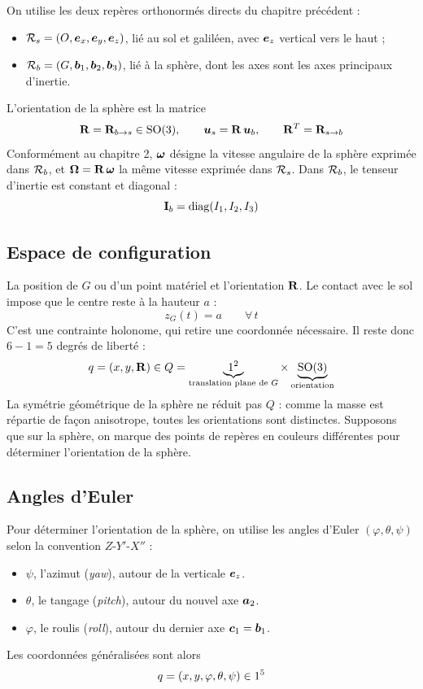 On utilise les deux repères orthonormés directs du chapitre
précédent :
\begin{itemize}
    \item $\mathcal{R}_{s} = (O,\bm{e}_x,\bm{e}_y,\bm{e}_z)$, lié au sol et
        galiléen, avec $\bm{e}_z$ vertical vers le haut ;
    \item $\mathcal{R}_{b} = (G,\bm{b}_1,\bm{b}_2,\bm{b}_3)$, lié à la
        sphère, dont les axes sont les axes principaux d'inertie.
\end{itemize}
L'orientation de la sphère est la matrice
\[
    \mathbf{R} = \mathbf{R}_{b\to s}\in\mathrm{SO}(3),
    \qquad
    \bm{u}_s = \mathbf{R}\,\bm{u}_b,
    \qquad
    \mathbf{R}^T = \mathbf{R}_{s\to b}
\]
Conformément au chapitre 2, $\bm{\omega}$ désigne la vitesse
angulaire de la sphère exprimée dans $\mathcal{R}_{b}$, et
$\bm{\Omega} = \mathbf{R}\,\bm{\omega}$ la même vitesse exprimée dans
$\mathcal{R}_{s}$. Dans $\mathcal{R}_{b}$, le tenseur d'inertie est constant et
diagonal :
\[
    \mathbf{I}_b = \mathrm{diag}(I_1,I_2,I_3)
\]

\subsection{Espace de configuration}

La position de $G$ ou d'un point matériel et
l'orientation $\mathbf{R}$. Le contact avec le sol impose que le centre
reste à la hauteur $a$ :
\[
    z_G(t) = a \qquad \forall\,t
\]
C'est une contrainte holonome, qui retire une coordonnée nécessaire. Il reste donc
$6 - 1 = 5$ degrés de liberté :
\[
    q = (x,y,\mathbf{R})\in Q = \underbrace{1^2}_{\text{translation plane
    de } G}\times\underbrace{\mathrm{SO}(3)}_{\text{orientation}}
\]
La symétrie géométrique de la sphère ne réduit pas $Q$ : comme la
masse est répartie de façon anisotrope, toutes les orientations sont
distinctes. Supposons que sur la sphère, on marque des points de repères en couleurs différentes pour déterminer l'orientation de la sphère.

\subsection{Angles d'Euler}

Pour déterminer l'orientation de la sphère, on utilise les angles d'Euler
$(\varphi,\theta,\psi)$ selon la convention $Z$-$Y'$-$X''$ :
\begin{itemize}
    \item $\psi$, l'azimut (\emph{yaw}), autour de la verticale
        $\bm{e}_z$.
    \item $\theta$, le tangage (\emph{pitch}), autour du nouvel axe
        $\bm{a}_2$.
    \item $\varphi$, le roulis (\emph{roll}), autour du dernier axe
        $\bm{c}_1 = \bm{b}_1$.
\end{itemize}
Les coordonnées généralisées sont alors
\[
    q = (x,y,\varphi,\theta,\psi)\in1^5
\]

